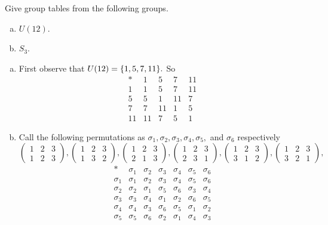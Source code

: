 \begin{problem}
	Give group tables from the following groups.
	\begin{enumerate}[(a)]
		\item $ U(12) $.
		\item $ S_3 $.
	\end{enumerate}
\end{problem}
\begin{solution}
	\begin{enumerate}[(a)]
		\item First observe that $ U(12) = \{1,5,7,11\}. $
		So 
		\[ \begin{array}{c|cccc}
			* & 1 & 5 & 7 & 11 \\
			\hline
			1 & 1 & 5 & 7 & 11 \\
			5 & 5 & 1 & 11 & 7 \\ 
			7 & 7 & 11 & 1 & 5 \\
			11 & 11 & 7 & 5 & 1
		\end{array} \]
		\item Call the following permutations as $ \sigma_1,\sigma_2,\sigma_3,\sigma_4,\sigma_5, $ and $ \sigma_6 $ respectively
		\[ \begin{pmatrix} 1&2&3\\1&2&3 \end{pmatrix}, \begin{pmatrix} 1&2&3\\1&3&2 \end{pmatrix}, \begin{pmatrix} 1&2&3\\2&1&3 \end{pmatrix},\begin{pmatrix} 1&2&3\\2&3&1  \end{pmatrix},\begin{pmatrix} 1&2&3\\3&1&2 \end{pmatrix},\begin{pmatrix} 1&2&3\\3&2&1 \end{pmatrix}, \]
		\[ 
		\begin{array}{c|cccccc}
			*        & \sigma_1 & \sigma_2 & \sigma_3 & \sigma_4 & \sigma_5 & \sigma_6 \\
			\hline 
			\sigma_1 & \sigma_1 & \sigma_2 & \sigma_3 & \sigma_4 & \sigma_5 & \sigma_6 \\ 
			\sigma_2 & \sigma_2 & \sigma_1 & \sigma_5 & \sigma_6 & \sigma_3 & \sigma_4 \\ \sigma_3 & \sigma_3 & \sigma_4 & \sigma_1 & \sigma_2 & \sigma_6 & \sigma_5 \\ 
			\sigma_4 & \sigma_4 & \sigma_3 & \sigma_6 & \sigma_5 & \sigma_1 & \sigma_2 \\
			\sigma_5 & \sigma_5 & \sigma_6 & \sigma_2 & \sigma_1 & \sigma_4 & \sigma_3 
		\end{array}
		\]
	\end{enumerate}
\end{solution}


